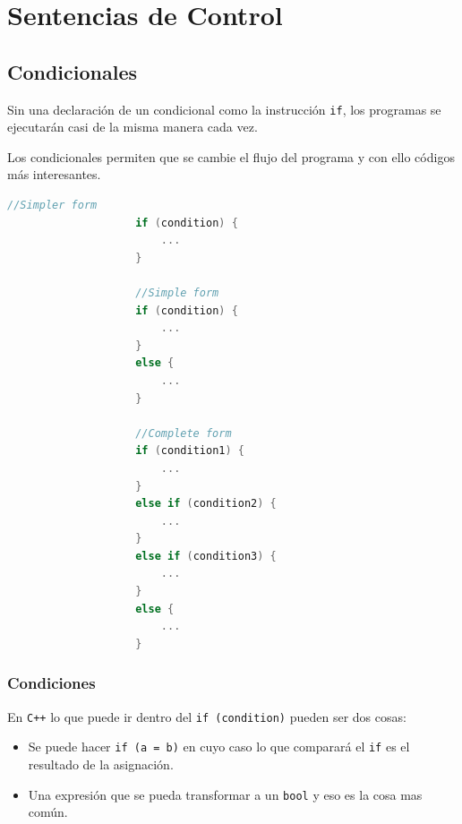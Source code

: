 \documentclass[12pt, fleqn]{report}                             %
\theoremstyle{break}                                            %
\newcommand \Cpp  {\texttt{C++} }                               %
\begin{document}
        \section{Sentencias de Control}

            \subsection{Condicionales}

                Sin una declaración de un condicional como la instrucción \texttt{if}, los programas
                se ejecutarán casi de la misma manera cada vez.
                
                Los condicionales permiten que se cambie el flujo del programa y con ello códigos
                más interesantes.

                \begin{lstlisting}[language=C++, gobble=20]
                    //Simpler form
                    if (condition) {
                        ...
                    }

                    //Simple form
                    if (condition) {
                        ...
                    }
                    else {
                        ...
                    }
                    
                    //Complete form
                    if (condition1) {
                        ...
                    }
                    else if (condition2) {
                        ...
                    }
                    else if (condition3) {
                        ...
                    }
                    else {
                        ...
                    }
                \end{lstlisting}


                \subsubsection{Condiciones}

                En \Cpp lo que puede ir dentro del \texttt{if (condition)} pueden ser dos cosas:
                \begin{itemize}
                    \item Se puede hacer \texttt{if (a = b)} en cuyo caso lo que comparará el 
                        \texttt{if} es el resultado de la asignación.
                    \item Una expresión que se pueda transformar a un \texttt{bool} y eso es la cosa
                        mas común.
                \end{itemize}
\end{document}
